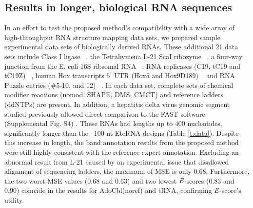 \subsection{Results in longer, biological RNA sequences}
In an effort to test the proposed method's compatibility with a wide array of high-throughput RNA structure mapping data sets, we prepared sample experimental data sets of biologically derived RNAs. These additional 21 data sets include Class I ligase ~\citep{Bagby01122009}, the Tetrahymena L-21 ScaI ribozyme ~\citep{russell2006}, a four-way junction from the E. coli 16S ribsomal RNA ~\citep{tian2014nature}, RNA replicases (C19, tC19 and tC19Z) ~\citep{Wochner08042011}, human Hox transcripts $5^\prime$ UTR (Hox5 and Hox9D189) ~\citep{xue2014} and RNA Puzzle entries (\#5-10, and 12) ~\citep{Cruz01042012}. In each data set, complete sets of chemical modifier reactions (nomod, SHAPE, DMS, CMCT) and reference ladders (ddNTPs) are present. In addition, a hepatitis delta virus genomic segment studied previously allowed direct comparison to the FAST software (Supplemental Fig. S4) \citep{Pang2011}. These RNAs had lengths up to 400 nucleotides, significantly longer than the ~100-nt EteRNA designs (Table \ref{t:data}). Despite this increase in length, the band annotation results from the proposed method were still highly consistent with the reference expert annotation. Excluding an abnormal result from L-21 caused by an experimental issue that disallowed alignment of sequencing ladders, the maximum of MSE is only 0.68. Furthermore, the two worst MSE values (0.68 and 0.63) and two lowest ${\emph{E}}$-scores (0.83 and 0.90) coincide in the results for AdoCbl(noref) and tRNA, confirming ${\emph{E}}$-score's utility. 

